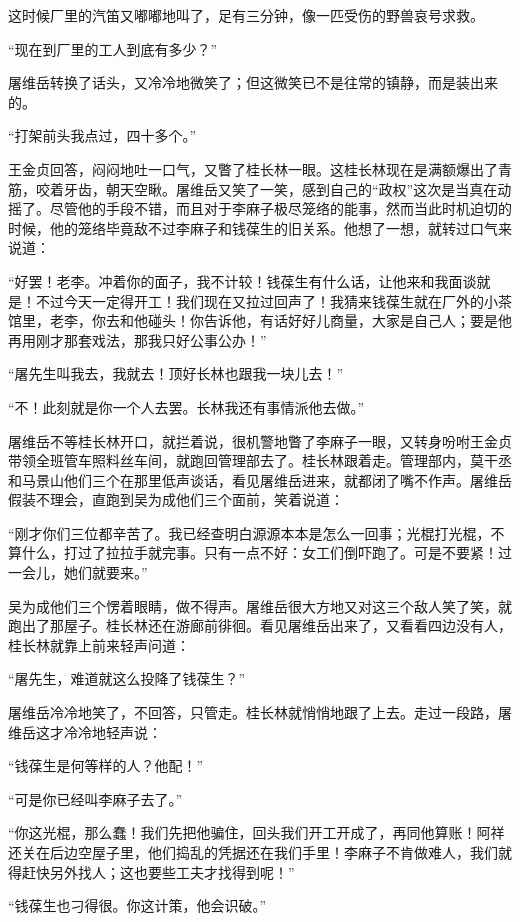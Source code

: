 \par 这时候厂里的汽笛又嘟嘟地叫了，足有三分钟，像一匹受伤的野兽哀号求救。
\par “现在到厂里的工人到底有多少？”
\par 屠维岳转换了话头，又冷冷地微笑了；但这微笑已不是往常的镇静，而是装出来的。
\par “打架前头我点过，四十多个。”
\par 王金贞回答，闷闷地吐一口气，又瞥了桂长林一眼。这桂长林现在是满额爆出了青筋，咬着牙齿，朝天空瞅。屠维岳又笑了一笑，感到自己的“政权”这次是当真在动摇了。尽管他的手段不错，而且对于李麻子极尽笼络的能事，然而当此时机迫切的时候，他的笼络毕竟敌不过李麻子和钱葆生的旧关系。他想了一想，就转过口气来说道：
\par “好罢！老李。冲着你的面子，我不计较！钱葆生有什么话，让他来和我面谈就是！不过今天一定得开工！我们现在又拉过回声了！我猜来钱葆生就在厂外的小茶馆里，老李，你去和他碰头！你告诉他，有话好好儿商量，大家是自己人；要是他再用刚才那套戏法，那我只好公事公办！”
\par “屠先生叫我去，我就去！顶好长林也跟我一块儿去！”
\par “不！此刻就是你一个人去罢。长林我还有事情派他去做。”
\par 屠维岳不等桂长林开口，就拦着说，很机警地瞥了李麻子一眼，又转身吩咐王金贞带领全班管车照料丝车间，就跑回管理部去了。桂长林跟着走。管理部内，莫干丞和马景山他们三个在那里低声谈话，看见屠维岳进来，就都闭了嘴不作声。屠维岳假装不理会，直跑到吴为成他们三个面前，笑着说道：
\par “刚才你们三位都辛苦了。我已经查明白源源本本是怎么一回事；光棍打光棍，不算什么，打过了拉拉手就完事。只有一点不好：女工们倒吓跑了。可是不要紧！过一会儿，她们就要来。”
\par 吴为成他们三个愣着眼睛，做不得声。屠维岳很大方地又对这三个敌人笑了笑，就跑出了那屋子。桂长林还在游廊前徘徊。看见屠维岳出来了，又看看四边没有人，桂长林就靠上前来轻声问道：
\par “屠先生，难道就这么投降了钱葆生？”
\par 屠维岳冷冷地笑了，不回答，只管走。桂长林就悄悄地跟了上去。走过一段路，屠维岳这才冷冷地轻声说：
\par “钱葆生是何等样的人？他配！”
\par “可是你已经叫李麻子去了。”
\par “你这光棍，那么蠢！我们先把他骗住，回头我们开工开成了，再同他算账！阿祥还关在后边空屋子里，他们捣乱的凭据还在我们手里！李麻子不肯做难人，我们就得赶快另外找人；这也要些工夫才找得到呢！”
\par “钱葆生也刁得很。你这计策，他会识破。”
